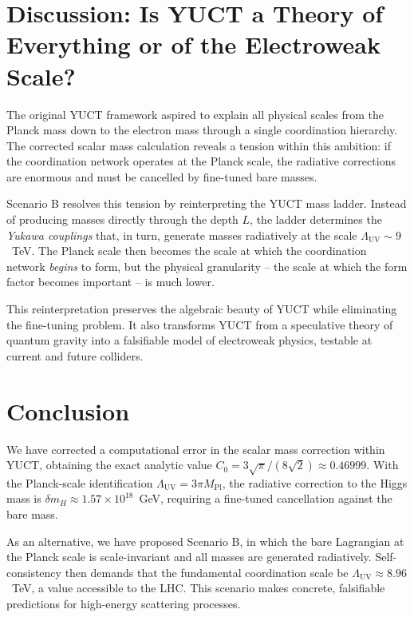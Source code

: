 \documentclass[12pt,a4paper]{article}
\newcommand{\Mpl}{M_{\mathrm{Pl}}}
\newcommand{\LUV}{\Lambda_{\mathrm{UV}}}
\theoremstyle{remark}
\begin{document}
	\section{Discussion: Is YUCT a Theory of Everything or of the Electroweak Scale?}
	\label{sec:discussion}
	
	The original YUCT framework aspired to explain all physical scales from the Planck mass down to the electron mass through a single coordination hierarchy.  The corrected scalar mass calculation reveals a tension within this ambition: if the coordination network operates at the Planck scale, the radiative corrections are enormous and must be cancelled by fine-tuned bare masses.
	
	Scenario B resolves this tension by reinterpreting the YUCT mass ladder.  Instead of producing masses directly through the depth \(L\), the ladder determines the \emph{Yukawa couplings} that, in turn, generate masses radiatively at the scale \(\LUV \sim 9\)~TeV.  The Planck scale then becomes the scale at which the coordination network \emph{begins} to form, but the physical granularity -- the scale at which the form factor becomes important -- is much lower.
	
	This reinterpretation preserves the algebraic beauty of YUCT while eliminating the fine-tuning problem.  It also transforms YUCT from a speculative theory of quantum gravity into a falsifiable model of electroweak physics, testable at current and future colliders.
	
	\section{Conclusion}
	\label{sec:conclusion}
	
	We have corrected a computational error in the scalar mass correction within YUCT, obtaining the exact analytic value \(C_0 = 3\sqrt{\pi}/(8\sqrt{2}) \approx 0.46999\).  With the Planck-scale identification \(\LUV = 3\pi\Mpl\), the radiative correction to the Higgs mass is \(\delta m_H \approx 1.57\times 10^{18}\)~GeV, requiring a fine-tuned cancellation against the bare mass.
	
	As an alternative, we have proposed Scenario B, in which the bare Lagrangian at the Planck scale is scale-invariant and all masses are generated radiatively.  Self-consistency then demands that the fundamental coordination scale be \(\LUV \approx 8.96\)~TeV, a value accessible to the LHC.  This scenario makes concrete, falsifiable predictions for high-energy scattering processes.
	
\end{document}
